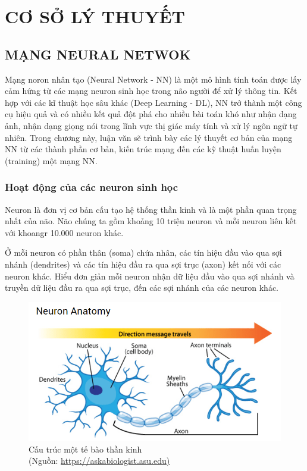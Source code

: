 \chapter{CƠ SỞ LÝ THUYẾT}
\section{MẠNG NEURAL NETWOK}
Mạng noron nhân tạo (Neural Network - NN) là một mô hình tính toán được lấy cảm hứng từ các mạng neuron sinh học trong não người để xử lý thông tin. Kết hợp với các kĩ thuật học sâu khác (Deep Learning - DL), NN  trở thành một công cụ hiệu quả và có nhiều kết quả đột phá cho nhiều bài toán khó như nhận dạng ảnh, nhận dạng giọng nói trong lĩnh vực thị giác máy tính và xử lý ngôn ngữ tự nhiên. Trong chương này, luận văn sẽ trình bày các lý thuyết cơ bản của mạng NN từ các thành phần cơ bản, kiến trúc mạng đến các kỹ thuật huấn luyện (training) một mạng NN.

\subsection{Hoạt động của các neuron sinh học}



Neuron là đơn vị cơ bản cấu tạo hệ thống thần kinh và là một phần quan trọng nhất của não. Não chúng ta gồm khoảng 10 triệu neuron và mỗi neuron liên kết với khoangr 10.000 neuron khác.

Ở mỗi neuron có phần thân (soma) chứa nhân, các tín hiệu đầu vào qua sợi nhánh (dendrites) và các tín hiệu đầu ra qua sợi trục (axon) kết nối với các neuron khác. Hiểu đơn giản mỗi neuron nhận dữ liệu đầu vào qua sợi nhánh và truyền dữ liệu đầu ra qua sợi trục, đến các sợi nhánh của các neuron khác.

\FloatBarrier
\begin{figure}[htp]
\begin{center}
\includegraphics[scale=0.8]{chap2/c2_figs/neuron.png}
\end{center}
\caption{Cấu trúc một tế bào thần kinh \\ (Nguồn: \url{https://askabiologist.asu.edu)}}
\label{fig:neuronsinhhoc}
\end{figure}
\FloatBarrier

